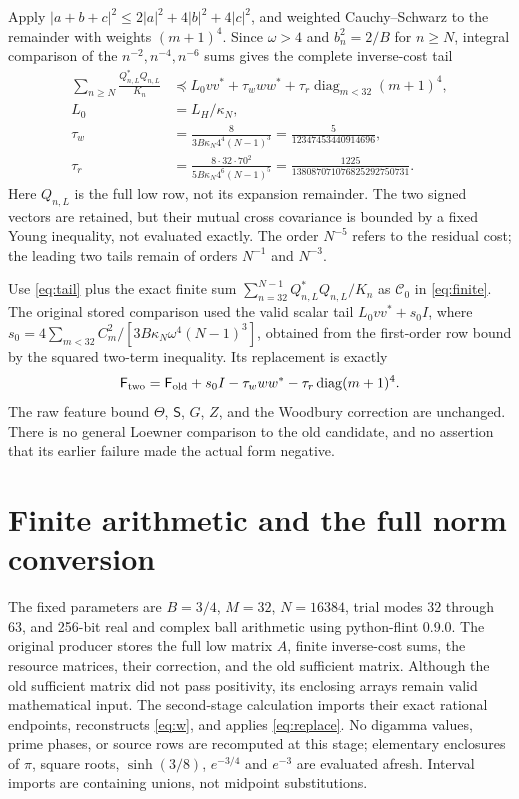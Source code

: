 \documentclass[11pt]{article}
\begin{document}
Apply $|a+b+c|^2\le2|a|^2+4|b|^2+4|c|^2$, and weighted Cauchy--Schwarz to the remainder with weights $(m+1)^4$. Since $\omega>4$ and $b_n^2=2/B$ for $n\ge N$, integral comparison of the $n^{-2},n^{-4},n^{-6}$ sums gives the complete inverse-cost tail
\begin{align}
 \sum_{n\ge N}\frac{Q_{n,L}^*Q_{n,L}}{K_n}
 &\preceq L_0vv^*+\tau_www^*+\tau_r\operatorname{diag}_{m<32}(m+1)^4,\label{eq:tail}\\
 L_0&=L_H/\kappa_N,\nonumber\\
 \tau_w&=\frac8{3B\kappa_N4^4(N-1)^3}
       =\frac5{12347453440914696},\nonumber\\
 \tau_r&=\frac{8\cdot32\cdot70^2}{5B\kappa_N4^6(N-1)^5}
       =\frac{1225}{138087071076825292750731}.\nonumber
\end{align}
Here $Q_{n,L}$ is the full low row, not its expansion remainder. The two signed vectors are retained, but their mutual cross covariance is bounded by a fixed Young inequality, not evaluated exactly. The order $N^{-5}$ refers to the residual cost; the leading two tails remain of orders $N^{-1}$ and $N^{-3}$.

Use \eqref{eq:tail} plus the exact finite sum $\sum_{n=32}^{N-1}Q_{n,L}^*Q_{n,L}/K_n$ as $\mathcal C_0$ in \eqref{eq:finite}. The original stored comparison used the valid scalar tail $L_0vv^*+s_0I$, where $s_0=4\sum_{m<32}C_m^2/[3B\kappa_N\omega^4(N-1)^3]$, obtained from the first-order row bound by the squared two-term inequality. Its replacement is exactly
\begin{equation}
 \mathsf F_{\rm two}=\mathsf F_{\rm old}+s_0I
             -\tau_www^*-\tau_r\operatorname{diag}(m+1)^4.\label{eq:replace}
\end{equation}
The raw feature bound $\Theta$, $\mathsf S$, $G$, $Z$, and the Woodbury correction are unchanged. There is no general Loewner comparison to the old candidate, and no assertion that its earlier failure made the actual form negative.

\section{Finite arithmetic and the full norm conversion}\label{sec:certificate}
The fixed parameters are $B=3/4$, $M=32$, $N=16384$, trial modes $32$ through $63$, and 256-bit real and complex ball arithmetic using python-flint 0.9.0. The original producer stores the full low matrix $A$, finite inverse-cost sums, the resource matrices, their correction, and the old sufficient matrix. Although the old sufficient matrix did not pass positivity, its enclosing arrays remain valid mathematical input. The second-stage calculation imports their exact rational endpoints, reconstructs \eqref{eq:w}, and applies \eqref{eq:replace}. No digamma values, prime phases, or source rows are recomputed at this stage; elementary enclosures of $\pi$, square roots, $\sinh(3/8)$, $e^{-3/4}$ and $e^{-3}$ are evaluated afresh. Interval imports are containing unions, not midpoint substitutions.
\end{document}
